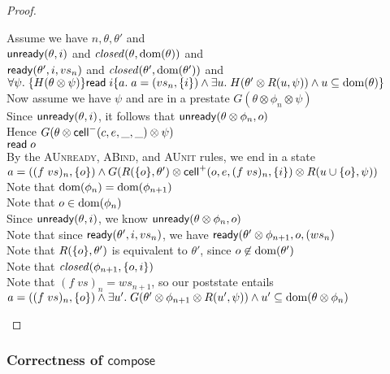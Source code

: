 \begin{proof}
\begin{tabbedproof}
\oo Assume we have $n, \theta, \theta'$ and  \\
\oo $\mathsf{unready}({\theta}, {i})$ and $\mathit{closed}(\theta, \mbox{dom}({\theta}))$ and \\
\oo $\mathsf{ready}({\theta'}, {i}, {vs_n})$ and $\mathit{closed}(\theta', \mbox{dom}({\theta'}))$ and \\
\oo  $\forall \psi.\;\{{H(\theta \otimes \psi)}\}{\mathsf{read}\; i}\{{a}.\;{a = (vs_n, \{{i}\}) \land \exists u.\; H(\theta' \otimes R(u, \psi)) \land u \subseteq \mbox{dom}({\theta})}\}$ \\
\ooo Now assume we have $\psi$ and are in a prestate $G(\theta \otimes \phi_n \otimes \psi)$ \\
\ooo Since $\mathsf{unready}({\theta}, {i})$, it follows that $\mathsf{unready}({\theta \otimes \phi_n}, {o})$ \\
\ooo Hence $G(\theta \otimes \mathsf{cell}^{-}({c}, {e}, {\_}, {\_}) \otimes \psi)$ \\
\ooo $\mathsf{read}\; o$ \\
\ooo By the \textsc{AUnready}, \textsc{ABind}, and \textsc{AUnit} rules, we end in a state \\
\ooo $a = ((f\;vs)_n, \{{o}\}) \land G(R(\{{o}\}, \theta') \otimes \mathsf{cell}^{+}({o}, {e}, {(f\;vs)_n}, {\{{i}\}}) \otimes R(u \cup \{{o}\}, \psi))$ \\
\ooo Note that $\mbox{dom}({\phi_n}) = \mbox{dom}({\phi_{n+1}})$ \\ 
\ooo Note that $o \in \mbox{dom}({\phi_n})$ \\
\ooo Since $\mathsf{unready}({\theta}, {i})$, we know $\mathsf{unready}({\theta \otimes \phi_n}, {o})$\\
\ooo Note that since $\mathsf{ready}({\theta'}, {i}, {vs_n})$, we have $\mathsf{ready}({\theta' \otimes \phi_{n+1}}, {o}, {(ws_n})$ \\
\ooo Note that $R(\{{o}\}, \theta')$ is equivalent to $\theta'$, since $o \not\in \mbox{dom}({\theta'})$ \\
\ooo Note that $\mathit{closed}(\phi_{n+1}, \{{o, i}\})$ \\
\ooo Note that $(f\;vs)_n = ws_{n+1}$, so our poststate entails \\ 
\ooox $a = ((f\;vs)_n, \{{o}\}) \land \exists u'.\; G(\theta' \otimes \phi_{n+1} \otimes R(u', \psi)) \land u' \subseteq \mbox{dom}({\theta \otimes \phi_n})$ \\
\end{tabbedproof}
\end{proof}

\subsubsection{Correctness of $\mathsf{compose}$}

